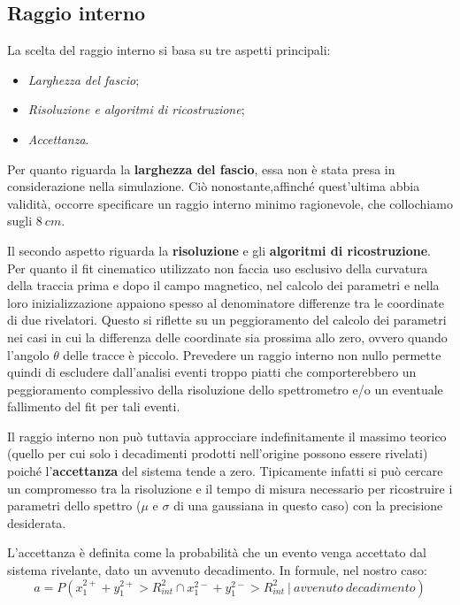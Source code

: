 \documentclass[8pt]{extarticle}
\begin{document}
\subsection{Raggio interno} \label{subsec:raggio_interno}
La scelta del raggio interno si basa su tre aspetti principali:
\begin{itemize}
\item \textit{Larghezza del fascio};
\item \textit{Risoluzione e algoritmi di ricostruzione};
\item \textit{Accettanza}.
\end{itemize}

Per quanto riguarda la \textbf{larghezza del fascio}, essa non è stata presa in considerazione nella simulazione. Ciò nonostante,affinché quest'ultima abbia validità, occorre specificare un raggio interno minimo ragionevole, che collochiamo sugli $8\ cm$. \medskip	

Il secondo aspetto riguarda la \textbf{risoluzione} e gli \textbf{algoritmi di ricostruzione}. Per quanto il fit cinematico utilizzato non faccia uso esclusivo della curvatura della traccia prima e dopo il campo magnetico, nel calcolo dei parametri e nella loro inizializzazione appaiono spesso al denominatore differenze tra le coordinate di due rivelatori. Questo si riflette su un peggioramento del calcolo dei parametri nei casi in cui la differenza delle coordinate sia prossima allo zero, ovvero quando l'angolo $\theta$ delle tracce è piccolo. Prevedere un raggio interno non nullo permette quindi di escludere dall'analisi eventi troppo piatti che comporterebbero un peggioramento complessivo della risoluzione dello spettrometro e/o un eventuale fallimento del fit per tali eventi. \medskip

Il raggio interno non può tuttavia approcciare indefinitamente il massimo teorico (quello per cui solo i decadimenti prodotti nell'origine possono essere rivelati) poiché l'\textbf{accettanza} del sistema tende a zero. Tipicamente infatti si può cercare un compromesso tra la risoluzione e il tempo di misura necessario per ricostruire i parametri dello spettro ($\mu$ e $\sigma$ di una gaussiana in questo caso) con la precisione desiderata. \medskip

L'accettanza è definita come la probabilità che un evento venga accettato dal sistema rivelante, dato un avvenuto decadimento. In formule, nel nostro caso: \\
$$
a = P(x_1^{2+} + y_1^{2+} > R_{int}^2 \cap x_1^{2-} + y_1^{2-} > R_{int}^2\ |\ avvenuto\ decadimento)
$$
\end{document}
